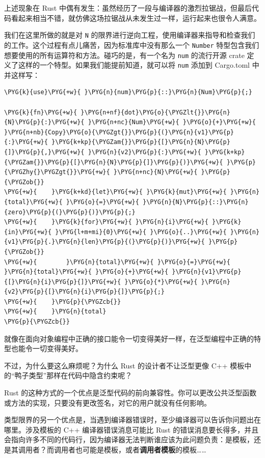 上述现象在 Rust 中偶有发生：虽然经历了一段与编译器的激烈拉锯战，但最后代码看起来相当不错，就仿佛这场拉锯战从未发生过一样，运行起来也很令人满意。

我们在这里所做的就是对 \texttt{N} 的限界进行逆向工程，使用编译器来指导和检查我们的工作。这个过程有点儿痛苦，因为标准库中没有那么一个 \texttt{Number} 特型包含我们想要使用的所有运算符和方法。碰巧的是，有一个名为 \texttt{num} 的流行开源 crate 定义了这样的一个特型。如果我们能提前知道，就可以将 \texttt{num} 添加到 Cargo.toml 中并这样写：

\begin{Verbatim}[commandchars=\\\{\},breaklines=true,breakanywhere=true,fontsize=\codefont,xleftmargin=17bp]
\PYG{k}{use}\PYG{+w}{ }\PYG{n}{num}\PYG{p}{::}\PYG{n}{Num}\PYG{p}{;}

\PYG{k}{fn}\PYG{+w}{ }\PYG{n+nf}{dot}\PYG{o}{\PYGZlt{}}\PYG{n}{N}\PYG{p}{:}\PYG{+w}{ }\PYG{n+nc}{Num}\PYG{+w}{ }\PYG{o}{+}\PYG{+w}{ }\PYG{n+nb}{Copy}\PYG{o}{\PYGZgt{}}\PYG{p}{(}\PYG{n}{v1}\PYG{p}{:}\PYG{+w}{ }\PYG{k+kp}{\PYGZam{}}\PYG{p}{[}\PYG{n}{N}\PYG{p}{]}\PYG{p}{,}\PYG{+w}{ }\PYG{n}{v2}\PYG{p}{:}\PYG{+w}{ }\PYG{k+kp}{\PYGZam{}}\PYG{p}{[}\PYG{n}{N}\PYG{p}{]}\PYG{p}{)}\PYG{+w}{ }\PYG{p}{\PYGZhy{}\PYGZgt{}}\PYG{+w}{ }\PYG{n+nc}{N}\PYG{+w}{ }\PYG{p}{\PYGZob{}}
\PYG{+w}{    }\PYG{k+kd}{let}\PYG{+w}{ }\PYG{k}{mut}\PYG{+w}{ }\PYG{n}{total}\PYG{+w}{ }\PYG{o}{=}\PYG{+w}{ }\PYG{n}{N}\PYG{p}{::}\PYG{n}{zero}\PYG{p}{(}\PYG{p}{)}\PYG{p}{;}
\PYG{+w}{    }\PYG{k}{for}\PYG{+w}{ }\PYG{n}{i}\PYG{+w}{ }\PYG{k}{in}\PYG{+w}{ }\PYG{l+m+mi}{0}\PYG{+w}{ }\PYG{o}{..}\PYG{+w}{ }\PYG{n}{v1}\PYG{p}{.}\PYG{n}{len}\PYG{p}{(}\PYG{p}{)}\PYG{+w}{ }\PYG{p}{\PYGZob{}}
\PYG{+w}{        }\PYG{n}{total}\PYG{+w}{ }\PYG{o}{=}\PYG{+w}{ }\PYG{n}{total}\PYG{+w}{ }\PYG{o}{+}\PYG{+w}{ }\PYG{n}{v1}\PYG{p}{[}\PYG{n}{i}\PYG{p}{]}\PYG{+w}{ }\PYG{o}{*}\PYG{+w}{ }\PYG{n}{v2}\PYG{p}{[}\PYG{n}{i}\PYG{p}{]}\PYG{p}{;}
\PYG{+w}{    }\PYG{p}{\PYGZcb{}}
\PYG{+w}{    }\PYG{n}{total}
\PYG{p}{\PYGZcb{}}
\end{Verbatim}

就像在面向对象编程中正确的接口能令一切变得美好一样，在泛型编程中正确的特型也能令一切变得美好。

不过，为什么要这么麻烦呢？为什么 Rust 的设计者不让泛型更像 C++ 模板中的“鸭子类型”那样在代码中隐含约束呢？

Rust 的这种方式的一个优点是泛型代码的前向兼容性。你可以更改公共泛型函数或方法的实现，只要没有更改签名，对它的用户就没有任何影响。

类型限界的另一个优点是，当遇到编译器错误时，至少编译器可以告诉你问题出在哪里。涉及模板的 C++ 编译器错误消息可能比 Rust 的错误消息要长得多，并且会指向许多不同的代码行，因为编译器无法判断谁应该为此问题负责：是模板，还是其调用者？而调用者也可能是模板，或者\textbf{调用者模板}的模板……

